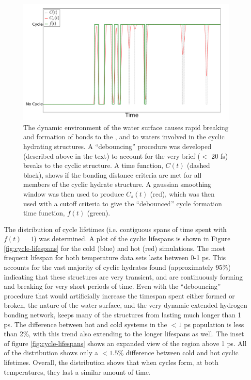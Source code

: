 \begin{figure}[h!]
	\begin{center}
		\includegraphics[scale=1.0]{images/cycles/cycle-debouncing-small.png}
		\caption{The dynamic environment of the water surface causes rapid breaking and formation of bonds to the \suldiox, and to waters involved in the cyclic hydrating structures. A ``debouncing'' procedure was developed (described above in the text) to account for the very brief ($<$ 20 fs) breaks to the cyclic structure. A time function, $C(t)$ (dashed black), shows if the bonding distance criteria are met for all members of the cyclic hydrate structure. A gaussian smoothing window was then used to produce $C_s(t)$ (red), which was then used with a cutoff criteria to give the ``debounced'' cycle formation time function, $f(t)$ (green).}
		\label{fig:debouncing}
	\end{center}
\end{figure}

The distribution of cycle lifetimes (i.e. contiguous spans of time spent with $f(t) = 1$) was determined. A plot of the cyclic lifespans is shown in Figure \ref{fig:cycle-lifespans} for the cold (blue) and hot (red) simulations. The most frequent lifespan for both temperature data sets lasts between 0-1 ps. This accounts for the vast majority of cyclic hydrates found (approximately 95\%) indicating that these structures are very transient, and are continuously forming and breaking for very short periods of time. Even with the ``debouncing'' procedure that would artificially increase the timespan spent either formed or broken, the nature of the water surface, and the very dynamic extended hydrogen bonding network, keeps many of the structures from lasting much longer than 1 ps. The difference between hot and cold systems in the $<1$ ps population is less than 2\%, with this trend also extending to the longer lifespans as well. The inset of figure \ref{fig:cycle-lifespans} shows an expanded view of the region above 1 ps. All of the distribution shows only a $<1.5$\% difference between cold and hot cyclic lifetimes. Overall, the distribution shows that when cycles form, at both temperatures, they last a similar amount of time. 

